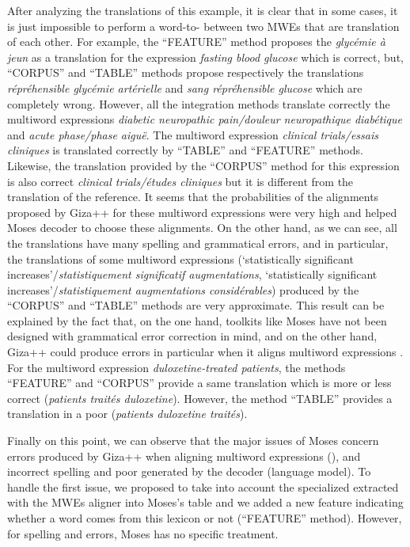 \documentclass[output=paper,modfonts,nonflat]{langsci/langscibook}
\begin{document}
After analyzing the translations of this example, it is clear that in some cases, it is just impossible to perform a word-to- between two MWEs that are translation of each other. For example, the ``FEATURE'' method proposes the  \textit{glycémie à jeun} as a translation for the expression \textit{fasting blood glucose} which is correct, but, ``CORPUS'' and ``TABLE'' methods propose respectively the translations \textit{répréhensible glycémie artérielle} and \textit{sang répréhensible glucose} which are completely wrong. However, all the integration methods translate correctly the multiword expressions \textit{diabetic neuropath\-ic pain\slash douleur neuropathique diabétique} and \textit{acute phase\slash phase aiguë}. The multiword expression \textit{clinical trials\slash essais cliniques} is translated correctly by ``TABLE'' and ``FEATURE'' methods. Likewise, the translation provided by the ``CORPUS'' method for this expression is also correct \textit{clinical trials\slash études cliniques} but it is different from the translation of the reference. It seems that the probabilities of the alignments proposed by Giza++ for these multiword expressions were very high and helped Moses decoder to choose these alignments. On the other hand, as we can see, all the translations have many spelling and grammatical errors, and in particular, the translations of some multiword expressions (`statistically significant increases'/\textit{statistiquement significatif augmentations}, `statistically significant increases'/\textit{statistiquement augmentations considérables}) produced by the ``CORPUS'' and ``TABLE'' methods are very approximate. This result can be explained by the fact that, on the one hand,  toolkits like Moses have not been designed with grammatical error correction in mind, and on the other hand, Giza++ could produce errors in particular when it aligns multiword expressions  \citep{fraser2007measuring}. For the multiword expression \textit{duloxetine-treated patients}, the methods ``FEATURE'' and ``CORPUS'' provide a same translation which is more or less correct (\textit{patients traités duloxetine}). However, the method ``TABLE'' provides a translation in a poor  (\textit{patients duloxetine traités}).

Finally on this point, we can observe that the major issues of Moses concern errors produced by Giza++ when aligning multiword expressions (), and incorrect spelling and poor  generated by the decoder (language model). To handle the first issue, we proposed to take into account the specialized  extracted with the MWEs aligner into Moses’s  table and we added a new feature indicating whether a word comes from this lexicon or not (``FEATURE'' method). However, for spelling and  errors, Moses has no specific treatment.
\end{document}
